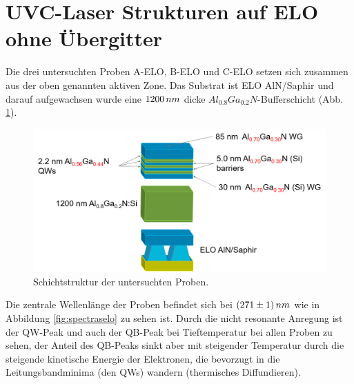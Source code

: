 \section{UVC-Laser Strukturen auf ELO ohne Übergitter}
Die drei untersuchten Proben A-ELO, B-ELO und C-ELO setzen sich zusammen aus der oben genannten aktiven Zone. Das Substrat ist ELO AlN/Saphir und darauf aufgewachsen wurde eine $1200 \thinspace nm$ dicke $ Al_{0.8}Ga_{0.2}N$-Bufferschicht (Abb. \ref{fig:schichtenelo}). 
\begin{figure}[H]
\includegraphics[width=\linewidth]{Bilder/TS4045/ts4045.png}
\caption{Schichtstruktur der untersuchten Proben.}
\label{fig:schichtenelo}
\end{figure}
\noindent 
Die zentrale Wellenlänge der Proben befindet sich bei $(271 \pm 1) \thinspace nm$ wie in Abbildung \ref{fig:spectraselo} zu sehen ist. Durch die nicht resonante Anregung ist der QW-Peak und auch der QB-Peak bei Tieftemperatur bei allen Proben zu sehen, der Anteil des QB-Peaks sinkt aber mit steigender Temperatur durch die steigende kinetische Energie der Elektronen, die bevorzugt in die Leitungsbandminima (den QWs) wandern (thermisches Diffundieren).
